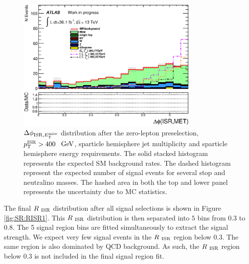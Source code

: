 \begin{figure}[h!]
  \begin{center}
     \includegraphics[width=0.80\textwidth]{figures/plotSR/SR_ND1_dphiISRI_6SR.eps}
  \caption[$\dPhiISRMET$ distribution after the zero-lepton preselection, $\pTISR > 400$ $\gev$, sparticle hemisphere jet multiplicity and sparticle hemisphere energy requirements]{$\dPhiISRMET$ distribution after the zero-lepton preselection, $\pTISR > 400$ $\gev$, sparticle hemisphere jet multiplicity and sparticle hemisphere energy requirements. The solid stacked histogram represents the expected SM background rates. The dashed histogram represent the expected number of signal events for several stop and neutralino masses. The hashed area in both the top and lower panel represents the uncertainty due to MC statistics.}
  \label{fig:SR:dphiISRMET}
    \end{center}
\end{figure}

\indent The final $R_{~\mathrm{ISR}}$ distribution after all signal selections is shown in Figure \ref{fig:SR:RISR1}.  This $R_{~\mathrm{ISR}}$ distribution is then separated into $5$ bins from $0.3$ to $0.8$.  The 5 signal region bins are fitted simultaneously to extract the signal strength.  We expect very few signal events in the $R_{~\mathrm{ISR}}$ region below 0.3. The same region is also dominated by QCD background.  As such, the $R_{~\mathrm{ISR}}$ region below 0.3 is not included in the final signal region fit.  \\

